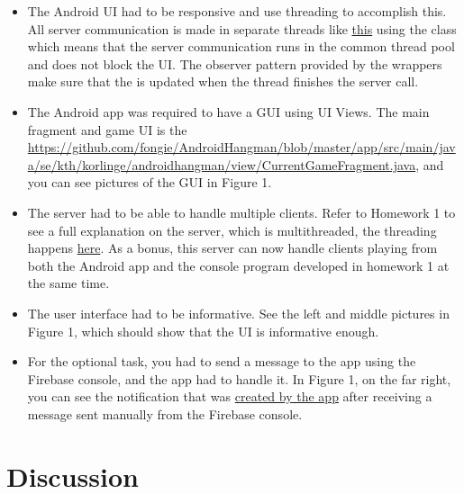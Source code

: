 \documentclass[a4paper]{scrartcl}
\begin{document}
\begin{itemize}
    \item The Android UI had to be responsive and use threading to accomplish this. All server communication is made in separate threads like \href{https://github.com/fongie/AndroidHangman/blob/master/app/src/main/java/se/kth/korlinge/androidhangman/repository/GameRepository.java#L38}{this} using the  class which means that the server communication runs in the common thread pool and does not block the UI. The observer pattern provided by the  wrappers make sure that the  is updated when the thread finishes the server call.

    \item The Android app was required to have a GUI using UI Views. The main fragment and game UI is the \href{CurrentGameFragment}{https://github.com/fongie/AndroidHangman/blob/master/app/src/main/java/se/kth/korlinge/androidhangman/view/CurrentGameFragment.java}, and you can see pictures of the GUI in Figure 1.

    \item The server had to be able to handle multiple clients. Refer to Homework 1 to see a full explanation on the server, which is multithreaded, the threading happens \href{https://github.com/fongie/Hangman/blob/master/hangmanserver/src/main/java/net/Server.java#L53}{here}. As a bonus, this server can now handle clients playing from both the Android app and the console program developed in homework 1 at the same time.
        
    \item The user interface had to be informative. See the left and middle pictures in Figure 1, which should show that the UI is informative enough.

    \item For the optional task, you had to send a message to the app using the Firebase console, and the app had to handle it. In Figure 1, on the far right, you can see the notification that was \href{https://github.com/fongie/AndroidHangman/blob/master/app/src/main/java/se/kth/korlinge/androidhangman/integration/MyFirebaseMessagingService.java#L31}{created by the app} after receiving a message sent manually from the Firebase console.

\end{itemize}


\section{Discussion}
\end{document}
